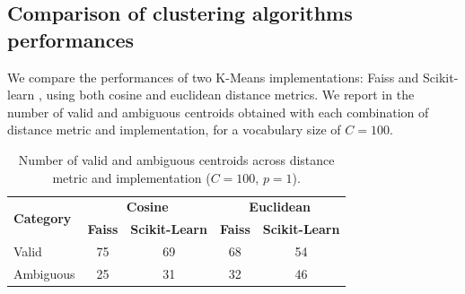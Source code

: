 


    \subsection{Comparison of clustering algorithms performances}
    \label{apd:chapter_5_clustering_technics}
    We compare the performances of two K-Means implementations: Faiss \cite{douze2024faiss} and Scikit-learn \cite{sklearn}, using both cosine and euclidean distance metrics. We report in  the number of valid and ambiguous centroids obtained with each combination of distance metric and implementation, for a vocabulary size of $C=100$. 

    \begin{table}[!htbp]
        \centering
        \begin{tabular}{lcc|cc}
            \hline
            \multirow{2}{*}{\textbf{Category}} & 
            \multicolumn{2}{c|}{\textbf{Cosine}} & 
            \multicolumn{2}{c}{\textbf{Euclidean}} \\
            & \textbf{Faiss} & \textbf{Scikit-Learn} & \textbf{Faiss} & \textbf{Scikit-Learn} \\
            \hline
            Valid & 75 & 69 & 68 & 54 \\
            Ambiguous & 25 & 31 & 32 & 46 \\
            \hline
        \end{tabular}
        \caption{Number of valid and ambiguous centroids across distance metric and implementation ($C=100$, $p=1$).}
        \label{tab:quality_counts}
    \end{table}

